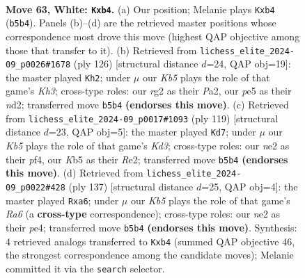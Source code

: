 \documentclass[11pt]{article}
\begin{document}
\clearpage

\begin{figure}[p]\centering
\begin{subfigure}{0.46\textwidth}\centering
\resizebox{\linewidth}{!}{%
\newchessgame
\chessboard[
  setfen={8/7p/4k3/1K2p2b/1p6/8/4n1r1/r7 w - - 16 63},
  showmover=false,
  pgfstyle=straightmove, color=movearrow, markmove={b5-b4}
]}
\caption{}
\end{subfigure}\hfill
\begin{subfigure}{0.46\textwidth}\centering
\resizebox{\linewidth}{!}{%
\newchessgame
\chessboard[
  setfen={8/p7/8/5p2/7p/4k2K/P2n4/8 w - - 2 64},
  showmover=false,
  pgfstyle=straightmove, color=movearrow, markmove={h3-h2}
]}
\caption{}
\end{subfigure}
\\[4pt]
\begin{subfigure}{0.46\textwidth}\centering
\resizebox{\linewidth}{!}{%
\newchessgame
\chessboard[
  setfen={8/8/3k4/5R2/5P2/8/4r1P1/5NK1 b - - 0 60},
  showmover=false,
  pgfstyle=straightmove, color=movearrow, markmove={d6-d7}
]}
\caption{}
\end{subfigure}\hfill
\begin{subfigure}{0.46\textwidth}\centering
\resizebox{\linewidth}{!}{%
\newchessgame
\chessboard[
  setfen={8/6k1/P7/8/1R2PPK1/r7/8/8 b - - 0 69},
  showmover=false,
  pgfstyle=straightmove, color=movearrow, markmove={a3-a6}
]}
\caption{}
\end{subfigure}
\caption{\textbf{Move 63, White: \texttt{Kxb4}.} (a) Our position; Melanie plays \texttt{Kxb4} (\texttt{b5b4}). Panels (b)--(d) are the retrieved master positions whose correspondence most drove this move (highest QAP objective among those that transfer to it). (b) Retrieved from \texttt{lichess\_elite\_2024-09\_p0026\#1678} (ply 126) [structural distance $d$=24, QAP obj=19]: the master played \texttt{Kh2}; under $\mu$ our \emph{Kb5} plays the role of that game's \emph{Kh3}; cross-type roles: our \emph{r}g2 as their \emph{P}a2, our \emph{p}e5 as their \emph{n}d2; transferred move \texttt{b5b4} \textbf{(endorses this move)}. (c) Retrieved from \texttt{lichess\_elite\_2024-09\_p0017\#1093} (ply 119) [structural distance $d$=23, QAP obj=5]: the master played \texttt{Kd7}; under $\mu$ our \emph{Kb5} plays the role of that game's \emph{Kd3}; cross-type roles: our \emph{n}e2 as their \emph{p}f4, our \emph{K}b5 as their \emph{R}e2; transferred move \texttt{b5b4} \textbf{(endorses this move)}. (d) Retrieved from \texttt{lichess\_elite\_2024-09\_p0022\#428} (ply 137) [structural distance $d$=25, QAP obj=4]: the master played \texttt{Rxa6}; under $\mu$ our \emph{Kb5} plays the role of that game's \emph{Ra6} (a \textbf{cross-type} correspondence); cross-type roles: our \emph{n}e2 as their \emph{p}e4; transferred move \texttt{b5b4} \textbf{(endorses this move)}. Synthesis: 4 retrieved analogs transferred to \texttt{Kxb4} (summed QAP objective 46, the strongest correspondence among the candidate moves); Melanie committed it via the \texttt{search} selector.}
\label{fig:thought-m124}
\end{figure}
\end{document}
